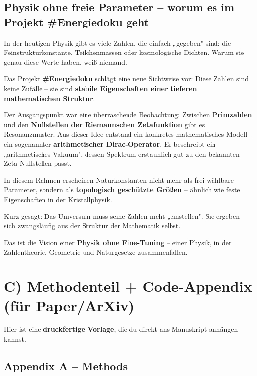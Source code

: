 \documentclass[11pt,a4paper]{article}
\begin{document}
\subsection*{Physik ohne freie Parameter -- worum es im Projekt \#Energiedoku geht}

In der heutigen Physik gibt es viele Zahlen, die einfach „gegeben" sind: die Feinstrukturkonstante, Teilchenmassen oder kosmologische Dichten. Warum sie genau diese Werte haben, weiß niemand.

Das Projekt \textbf{\#Energiedoku} schlägt eine neue Sichtweise vor:
Diese Zahlen sind keine Zufälle -- sie sind \textbf{stabile Eigenschaften einer tieferen mathematischen Struktur}.

Der Ausgangspunkt war eine überraschende Beobachtung: Zwischen \textbf{Primzahlen} und den \textbf{Nullstellen der Riemannschen Zetafunktion} gibt es Resonanzmuster. Aus dieser Idee entstand ein konkretes mathematisches Modell -- ein sogenannter \textbf{arithmetischer Dirac-Operator}. Er beschreibt ein „arithmetisches Vakuum", dessen Spektrum erstaunlich gut zu den bekannten Zeta-Nullstellen passt.

In diesem Rahmen erscheinen Naturkonstanten nicht mehr als frei wählbare Parameter, sondern als \textbf{topologisch geschützte Größen} -- ähnlich wie feste Eigenschaften in der Kristallphysik.

Kurz gesagt:
Das Universum muss seine Zahlen nicht „einstellen".
Sie ergeben sich zwangsläufig aus der Struktur der Mathematik selbst.

Das ist die Vision einer \textbf{Physik ohne Fine-Tuning} -- einer Physik, in der Zahlentheorie, Geometrie und Naturgesetze zusammenfallen.

\newpage

\section*{C) Methodenteil + Code-Appendix (für Paper/ArXiv)}

Hier ist eine \textbf{druckfertige Vorlage}, die du direkt ans Manuskript anhängen kannst.

\subsection*{Appendix A -- Methods}
\end{document}
